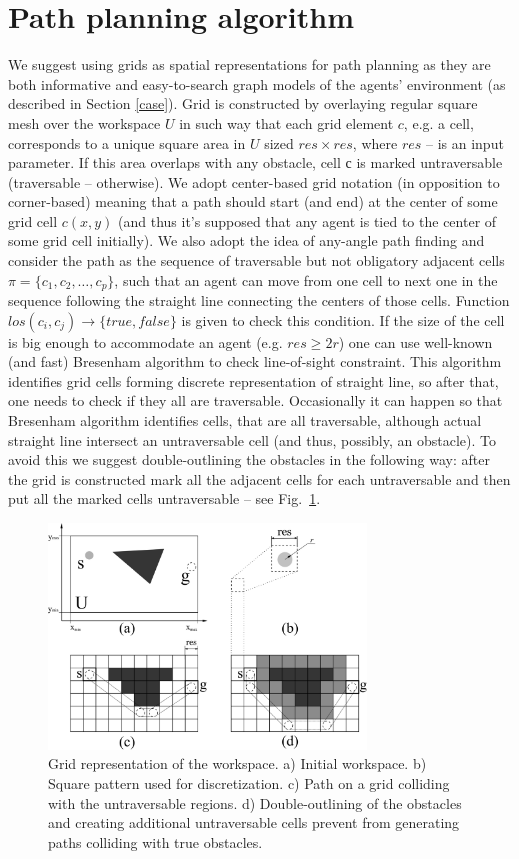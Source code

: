 \documentclass[runningheads,a4paper]{llncs}
\begin{document}
\section{Path planning algorithm}\label{path}

We suggest using grids as spatial representations for path planning as they are both informative and easy-to-search graph models of the agents' environment (as described in Section \ref{case}). Grid is constructed by overlaying regular square mesh over the workspace $U$ in such way that each grid element $c$, e.g. a cell, corresponds to a unique square area in $U$ sized $res \times res$, where $res$ – is an input parameter. If this area overlaps with any obstacle, cell с is marked untraversable (traversable – otherwise). We adopt center-based grid notation (in opposition to corner-based) meaning that a path should start (and end) at the center of some grid cell $c(x, y)$ (and thus it's supposed that any agent is tied to the center of some grid cell initially). We also adopt the idea of any-angle path finding \cite{Nash2007} and consider the path as the sequence of traversable but not obligatory adjacent cells $\pi=\{c_1, c_2, \dots, c_p\}$, such that an agent can move from one cell to next one in the sequence following the straight line connecting the centers of those cells. Function $los(c_i, c_j)\rightarrow\{true, false\}$ is given to check this condition. If the size of the cell is big enough to accommodate an agent (e.g. $res\geq 2r$) one can use well-known (and fast) Bresenham algorithm \cite{Bresenham1965} to check line-of-sight constraint. This algorithm identifies grid cells forming discrete representation of straight line, so after that, one needs to check if they all are traversable. Occasionally it can happen so that Bresenham algorithm identifies cells, that are all traversable, although actual straight line intersect an untraversable cell (and thus, possibly, an obstacle). To avoid this we suggest double-outlining the obstacles in the following way: after the grid is constructed mark all the adjacent cells for each untraversable and then put all the marked cells untraversable – see Fig.~\ref{fig:grid}.

\begin{figure}
	\centering
	\includegraphics[height=6cm]{path_grid}
	\caption{Grid representation of the workspace. a) Initial workspace. b) Square pattern used for discretization. c) Path on a grid colliding with the untraversable regions. d) Double-outlining of the obstacles and creating additional untraversable cells prevent from generating paths colliding with true obstacles.}
	\label{fig:grid}
\end{figure}
\end{document}
